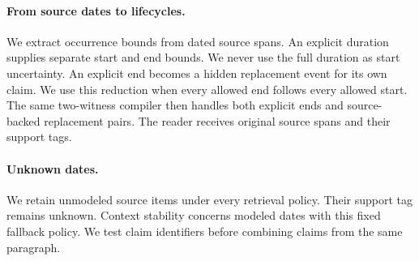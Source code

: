 \paragraph{From source dates to lifecycles.}
We extract occurrence bounds from dated source spans.
An explicit duration supplies separate start and end bounds.
We never use the full duration as start uncertainty.
An explicit end becomes a hidden replacement event for its own claim.
We use this reduction when every allowed end follows every allowed start.
The same two-witness compiler then handles both explicit ends and source-backed replacement pairs.
The reader receives original source spans and their support tags.

\paragraph{Unknown dates.}
We retain unmodeled source items under every retrieval policy.
Their support tag remains unknown.
Context stability concerns modeled dates with this fixed fallback policy.
We test claim identifiers before combining claims from the same paragraph.
